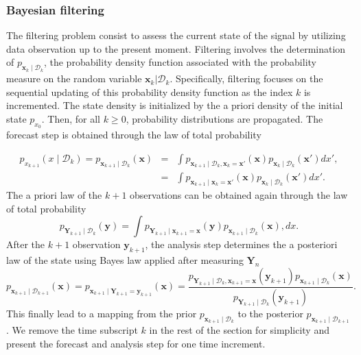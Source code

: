 \subsubsection{Bayesian filtering}

The filtering problem consist to assess the current state of the signal by utilizing data observation up to the present moment. Filtering involves the determination of $p_{\bm x_{k} \mid \mathcal{D}_{k}}$, the probability density function associated with the probability measure on the random variable $\bm x_{k} | \mathcal D_{k}$. Specifically, filtering focuses on the sequential updating of this probability density function as the index $k$ is incremented.
The state density is initialized by the a priori density of the initial state $p_{x_0}$.
Then, for all $k \geq 0$, probability distributions are propagated.
The forecast step is obtained through the law of total probability

\begin{eqnarray*}
    p_{x_{k+1}}(x \mid \mathcal D_k) = p_{\bm x_{k+1} \mid \mathcal D_k}(\bm x) &=& \int p_{\bm x_{k+1}\mid \mathcal D_k,\bm x_{k} = \bm x'}(\bm x) p_{\bm x_{k} \mid \mathcal D_k}(\bm x') dx',\\
    &=& \int p_{\bm x_{k+1}\mid \bm x_{k} = \bm x'}(\bm x) p_{\bm x_{k}\mid \mathcal D_k}(\bm x') dx'.
\end{eqnarray*}
The a priori law of the $k+1$ observations can be obtained again through the law of total probability
\begin{equation*}
    p_{\bm Y_{k+1}\mid \mathcal D_k}(\bm y) = \int p_{\bm Y_{k+1}\mid \bm x_{k+1} = \bm x}(\bm y) p_{\bm x_{k+1} \mid \mathcal D_k}(\bm x) , dx.
\end{equation*}
After the $k+1$ observation $\bm y_{k+1}$, the analysis step determines the a posteriori law of the state using Bayes law applied after measuring $\bm Y_n$
\begin{equation*}
    p_{\bm x_{k+1} \mid \mathcal D_{k+1}}(\bm x) = p_{\bm x_{k+1} \mid \bm Y_{k+1} = \bm y_{k+1}}(\bm x) = \frac{p_{\bm Y_{k+1} \mid \mathcal D_k,\bm x_{k+1} = \bm x}(\bm y_{k+1}) p_{\bm x_{k+1}\mid \mathcal D_k}(\bm x) }{p_{\bm Y_{k+1}\mid \mathcal D_k}(\bm y_{k+1})}.
\end{equation*} This finally lead to a mapping from the prior $p_{\bm x_{k+1} \mid \mathcal D_k}$ to the posterior $p_{\bm x_{k+1} \mid \mathcal D_{k+1}}$.
We remove the time subscript $k$ in the rest of the section for simplicity and present the forecast and analysis step for one time increment.

